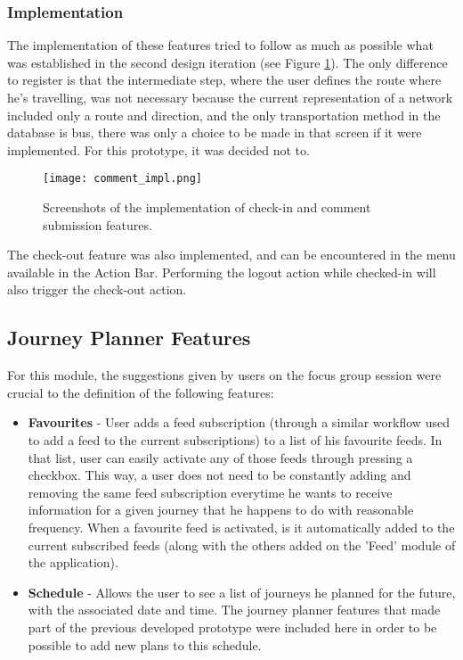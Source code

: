 \newpage
\subsubsection{Implementation}

The implementation of these features tried to follow as much as possible what was established in the second design iteration (see Figure \ref{fig:comment_impl}). The only difference to register is that the intermediate step, where the user defines the route where he's travelling, was not necessary because the current representation of a network included only a route and direction, and the only transportation method in the database is bus, there was only a choice to be made in that screen if it were implemented. For this prototype, it was decided not to.

\begin{figure}[h!]
  \begin{center}
    \leavevmode
    \texttt{[image: comment\_impl.png]}
    \caption{Screenshots of the implementation of check-in and comment submission features.}
    \label{fig:comment_impl}
  \end{center}
\end{figure}

The check-out feature was also implemented, and can be encountered in the menu available in the Action Bar. Performing the logout action while checked-in will also trigger the check-out action.

\newpage

\subsection{Journey Planner Features}\label{journeyplanner}

For this module, the suggestions given by users on the focus group session were crucial to the definition of the following features:

\begin{itemize}
\item \textbf{Favourites} - User adds a feed subscription (through a similar workflow used to add a feed to the current subscriptions) to a list of his favourite feeds. In that list, user can easily activate any of those feeds through pressing a checkbox. This way, a user does not need to be constantly adding and removing the same feed subscription everytime he wants to receive information for a given journey that he happens to do with reasonable frequency.
When a favourite feed is activated, is it automatically added to the current subscribed feeds (along with the others added on the 'Feed' module of the application).
\item \textbf{Schedule} - Allows the user to see a list of journeys he planned for the future, with the associated date and time. The journey planner features that made part of the previous developed prototype \cite{kn:eSG12} were included here in order to be possible to add new plans to this schedule.
\end{itemize} 

